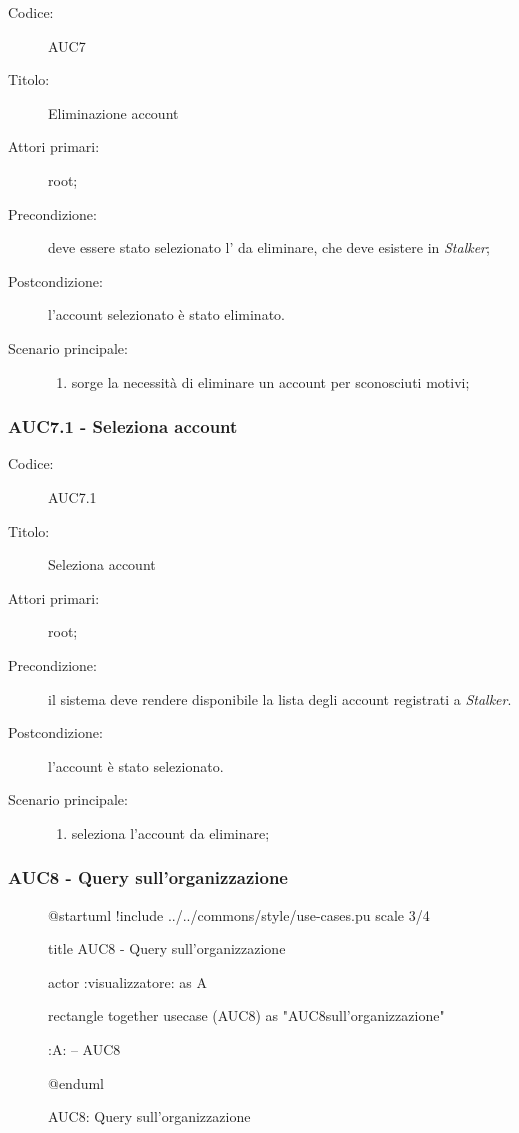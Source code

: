 \documentclass[casi-duso]{subfiles}
\begin{document}
\begin{description}
  \item[Codice:] AUC7
  \item[Titolo:] Eliminazione account
  \item[Attori primari:] root;
  \item[Precondizione:] deve essere stato selezionato l' da eliminare, che deve esistere in \emph{Stalker};
  \item[Postcondizione:] l'account selezionato è stato eliminato.
  \item[Scenario principale:]
  \begin{enumerate}
    \item sorge la necessità di eliminare un account per sconosciuti motivi;
  \end{enumerate}
\end{description}

\subsubsection{AUC7.1 - Seleziona account}%
\label{subsub:AUC7.1}
\begin{description}
  \item[Codice:] AUC7.1
  \item[Titolo:] Seleziona account
  \item[Attori primari:] root;
  \item[Precondizione:] il sistema deve rendere disponibile la lista degli account registrati a \emph{Stalker}.
  \item[Postcondizione:] l'account è stato selezionato.
  \item[Scenario principale:]
  \begin{enumerate}
    \item {} seleziona l'account da eliminare;
  \end{enumerate}
\end{description}

\subsubsection{AUC8 - Query sull'organizzazione}%
\label{subsub:AUC8}

\begin{figure}[h!] 
  \centering 
  \begin{plantuml}
  @startuml
  !include ../../commons/style/use-cases.pu
  scale 3/4

  title AUC8 - Query sull'organizzazione

  actor :visualizzatore: as A

  rectangle {
    together {
      usecase (AUC8) as "AUC8\nQuery sull'organizzazione"
    }
  }

  :A: -- AUC8

  @enduml
  \end{plantuml} 
  \caption{AUC8: Query sull'organizzazione} 
  \label{fig:auc8} 
\end{figure}
\end{document}
